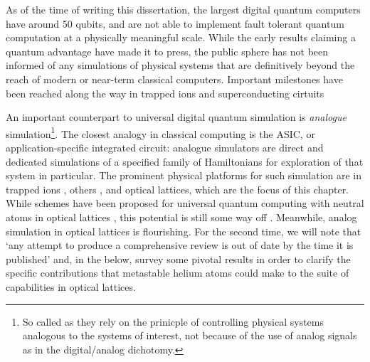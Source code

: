 	As of the time of writing this dissertation, the largest digital quantum computers have around 50 qubits, and are not able to implement fault tolerant quantum computation at a physically meaningful scale. While the early results claiming a quantum advantage have made it to press, the public sphere has not been informed of any simulations of physical systems that are definitively beyond the reach of modern or near-term classical computers. Important milestones have been reached along the way in trapped ions \cite{} and superconducting cirtuits \cite{}

	An important counterpart to universal digital quantum simulation is \emph{analogue} simulation\footnote{So called as they rely on the prinicple of controlling physical systems analogous to the systems of interest, not because of the use of analog signals as in the digital/analog dichotomy.}. The closest analogy in classical computing is the ASIC, or application-specific integrated circuit: analogue simulators are direct and dedicated simulations of a specified family of Hamiltonians for exploration of that system in particular. The prominent physical platforms for such simulation are in trapped ions \cite{}, others \cite{}, and optical lattices, which are the focus of this chapter. While schemes have been proposed for universal quantum computing with neutral atoms in optical lattices \cite{brennen99,henriet20}, this potential is still some way off \cite{markov00}. Meanwhile, analog simulation in optical lattices is flourishing. For the second time, we will note that `any attempt to produce a comprehensive review is out of date by the time it is published' and, in the below, survey some pivotal results in order to clarify the specific contributions that metastable helium atoms could make to the suite of capabilities in optical lattices.


